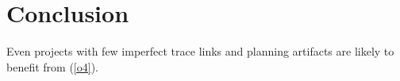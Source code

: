 \section{Conclusion}
\label{sec:conslusion}
Even projects with few imperfect trace links and planning artifacts are likely to benefit from \appr{} (\ref{o4}).
